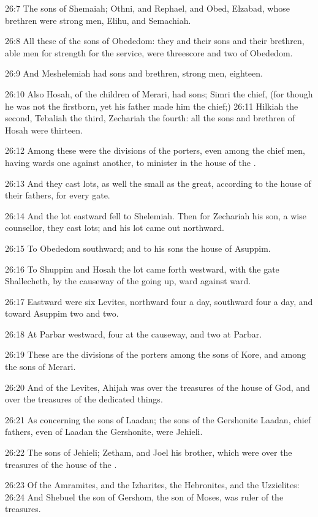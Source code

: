 26:7 The sons of Shemaiah; Othni, and Rephael, and Obed, Elzabad,
whose brethren were strong men, Elihu, and Semachiah.

26:8 All these of the sons of Obededom: they and their sons and their
brethren, able men for strength for the service, were threescore and
two of Obededom.

26:9 And Meshelemiah had sons and brethren, strong men, eighteen.

26:10 Also Hosah, of the children of Merari, had sons; Simri the
chief, (for though he was not the firstborn, yet his father made him
the chief;) 26:11 Hilkiah the second, Tebaliah the third, Zechariah
the fourth: all the sons and brethren of Hosah were thirteen.

26:12 Among these were the divisions of the porters, even among the
chief men, having wards one against another, to minister in the house
of the \LORD.

26:13 And they cast lots, as well the small as the great, according to
the house of their fathers, for every gate.

26:14 And the lot eastward fell to Shelemiah. Then for Zechariah his
son, a wise counsellor, they cast lots; and his lot came out
northward.

26:15 To Obededom southward; and to his sons the house of Asuppim.

26:16 To Shuppim and Hosah the lot came forth westward, with the gate
Shallecheth, by the causeway of the going up, ward against ward.

26:17 Eastward were six Levites, northward four a day, southward four
a day, and toward Asuppim two and two.

26:18 At Parbar westward, four at the causeway, and two at Parbar.

26:19 These are the divisions of the porters among the sons of Kore,
and among the sons of Merari.

26:20 And of the Levites, Ahijah was over the treasures of the house
of God, and over the treasures of the dedicated things.

26:21 As concerning the sons of Laadan; the sons of the Gershonite
Laadan, chief fathers, even of Laadan the Gershonite, were Jehieli.

26:22 The sons of Jehieli; Zetham, and Joel his brother, which were
over the treasures of the house of the \LORD.

26:23 Of the Amramites, and the Izharites, the Hebronites, and the
Uzzielites: 26:24 And Shebuel the son of Gershom, the son of Moses,
was ruler of the treasures.

